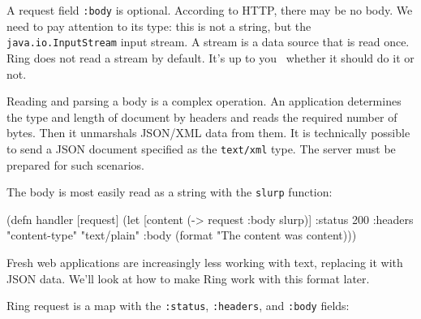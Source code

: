
A request field \verb|:body| is optional. According to HTTP, there may be no body. We need to pay attention to its type: this is not a string, but the \verb|java.io.InputStream| input stream. A stream is a data source that is read once. Ring does not read a stream by default. It's up to you  whether it should do it or not.


Reading and parsing a body is a complex operation. An application determines the type and length of document by headers and reads the required number of bytes. Then it unmarshals JSON/XML data from them. It is technically possible to send a JSON document specified as the \verb|text/xml| type. The server must be prepared for such scenarios.

The body is most easily read as a string with the \verb|slurp| function:

\ifx\DEVICETYPE\MOBILE

\begin{english}
  \begin{clojure}
(defn handler [request]
 (let [content (-> request :body slurp)]
  {:status 200
   :headers {"content-type" "text/plain"}
   :body (format "The content was %
                 content)}))
  \end{clojure}
\end{english}

\else

\begin{english}
\end{english}

\fi

Fresh web applications are increasingly less working with text, replacing it with JSON data. We'll look at how to make Ring work with this format later.


Ring request is a map with the \verb|:status|, \verb|:headers|, and \verb|:body| fields:

